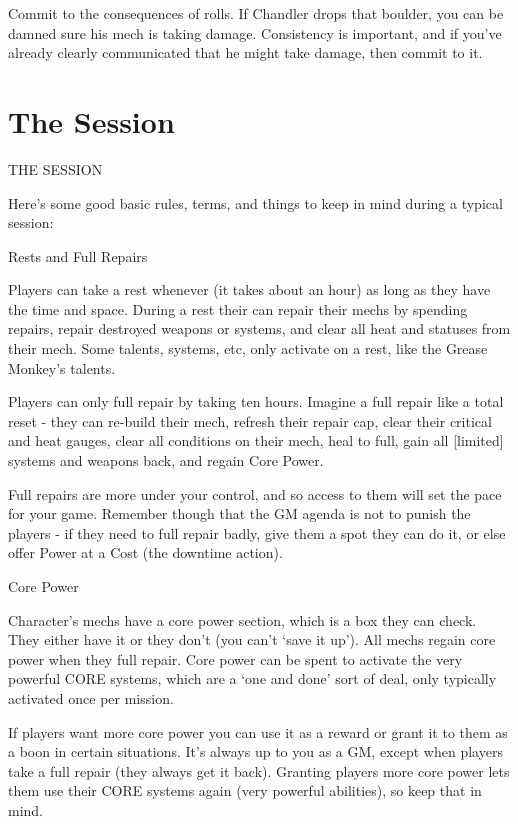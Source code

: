 Commit to the consequences of rolls. If Chandler drops that boulder, you can be damned sure  
his mech is taking damage. Consistency is important, and if you’ve already clearly  
communicated that he might take damage, then commit to it.
 
\chapter{The Session}
                                            THE SESSION  

Here’s some good basic rules, terms, and things to keep in mind during a typical session:
 

                                         Rests and Full Repairs
 

Players can take a rest whenever (it takes about an hour) as long as they have the time and  
space. During a rest their can repair their mechs by spending repairs, repair destroyed weapons  
or systems, and clear all heat and statuses from their mech. Some talents, systems, etc, only  
activate on a rest, like the Grease Monkey’s talents.
 

Players can only full repair by taking ten hours. Imagine a full repair like a total reset - they can  
re-build their mech, refresh their repair cap, clear their critical and heat gauges, clear all  
conditions on their mech, heal to full, gain all [limited] systems and weapons back, and regain  
Core Power.
 

Full repairs are more under your control, and so access to them will set the pace for your game.  
Remember though that the GM agenda is not to punish the players - if they need to full repair  
badly, give them a spot they can do it, or else offer Power at a Cost (the downtime action).
 

                                                Core Power  

Character’s mechs have a core power section, which is a box they can check. They either have  
it or they don’t (you can’t ‘save it up’). All mechs regain core power when they full repair. Core  
power can be spent to activate the very powerful CORE systems, which are a ‘one and done’  
sort of deal, only typically activated once per mission.
 

If players want more core power you can use it as a reward or grant it to them as a boon in  
certain situations. It’s always up to you as a GM, except when players take a full repair (they  
always get it back). Granting players more core power lets them use their CORE systems again  
(very powerful abilities), so keep that in mind.
 

